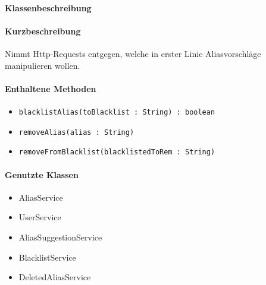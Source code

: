 \paragraph*{Klassenbeschreibung}%
\paragraph*{Kurzbeschreibung}
Nimmt Http-Requests entgegen, welche in erster Linie Aliasvorschläge manipulieren wollen.
\paragraph*{Enthaltene Methoden}
\begin{itemize}
    \item \texttt{blacklistAlias(toBlacklist : String) : boolean}
    \item \texttt{removeAlias(alias : String)}
    \item \texttt{removeFromBlacklist(blacklistedToRem : String)}
\end{itemize}
\paragraph*{Genutzte Klassen}
\begin{itemize}
    \item AliasService
    \item UserService
    \item AliasSuggestionService
    \item BlacklistService
    \item DeletedAliasService
\end{itemize}
